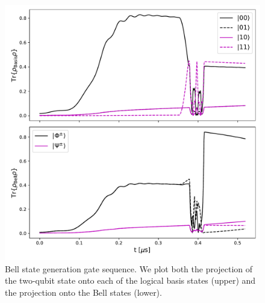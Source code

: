 \begin{figure}[t]
    \centering
    \includegraphics[width=\columnwidth]{figures/bell.pdf}
    \caption{Bell state generation gate sequence. We plot both the projection of the two-qubit state onto each of the logical basis states (upper) and the projection onto the Bell states (lower).}
    \label{fig:bell}
\end{figure}


